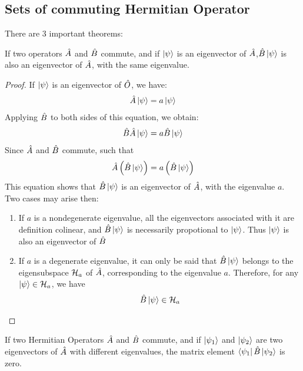 \subsection{Sets of commuting Hermitian Operator}
There are 3 important theorems: 
\begin{theorem}
    If two operators $\hat{A}$ and $\hat{B}$ commute, and if $\ket{\psi}$ is an eigenvector of $\hat{A}$,$\hat{B} \ket{\psi}$ is also an eigenvector of $\hat{A}$, with the same eigenvalue.
\end{theorem}
\begin{proof}
    If $\ket{\psi}$ is an eigenvector of $\hat{O}$, we have: 
    \begin{eqnarray}
        \hat{A} \ket{\psi} = a \ket{\psi}
    \end{eqnarray}
    Applying $\hat{B}$ to both sides of this equation, we obtain: 
    \begin{eqnarray*}
        \hat{B} \hat{A} \ket{\psi} = a \hat{B} \ket{\psi}
    \end{eqnarray*}
    Since $\hat{A}$ and $\hat{B}$ commute, such that 
    \begin{eqnarray*}
        \hat{A} \left( \hat{B} \ket{\psi} \right) = a \left(\hat{B} \ket{\psi}\right)
    \end{eqnarray*}
    This equation shows that $\hat{B} \ket{\psi}$ is an eigenvector of $\hat{A}$, with the eigenvalue $a$. Two cases may arise then: 
    \begin{enumerate}[label=\roman*.]
        \item If $a$ is a nondegenerate eigenvalue, all the eigenvectors associated with it are definition colinear, and $\hat{B} \ket{\psi}$ is necessarily propotional to $\ket{\psi}$. Thus $\ket{\psi}$ is also an eigenvector of $\hat{B}$
        \item If $a$ is a degenerate eigenvalue, it can only be said that $\hat{B} \ket{\psi}$ belongs to the eigensubspace $\mathcal{H}_a$ of $\hat{A}$, corresponding to the eigenvalue $a$. Therefore, for any $\ket{\psi} \in \mathcal{H}_a$, we have 
        \begin{eqnarray*}
            \hat{B} \ket{\psi} \in \mathcal{H}_a
        \end{eqnarray*}
    \end{enumerate}
\end{proof}
 
\begin{theorem}
    If two Hermitian Operators $\hat{A}$ and $\hat{B}$ commute, and if $\ket{\psi_1}$ and $\ket{\psi_2}$ are two eigenvectors of $\hat{A}$ with different eigenvalues, the matrix element $\bra{\psi_1} \hat{B} \ket{\psi_2}$ is zero.
\end{theorem}






